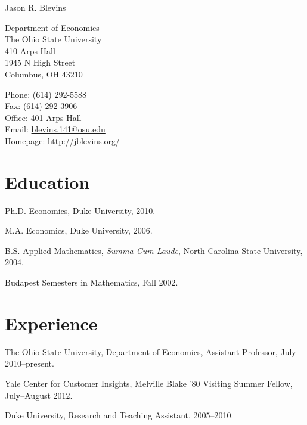 \documentclass[10pt,letterpaper]{article}
\def\name{Jason R. Blevins}
\renewenvironment{itemize}{
  \begin{list}{}{
    \setlength{\leftmargin}{1.5em}
    \setlength{\itemsep}{0.25em}
    \setlength{\parskip}{0pt}
    \setlength{\parsep}{0.25em}
  }
}{
  \end{list}
}
\begin{document}
{\huge \name}


\bigskip

\begin{minipage}[t]{0.495\textwidth}
  Department of Economics \\
  The Ohio State University \\
  410 Arps Hall \\
  1945 N High Street \\
  Columbus, OH 43210
\end{minipage}
\begin{minipage}[t]{0.495\textwidth}
  Phone: (614) 292-5588 \\
  Fax: (614) 292-3906 \\
  Office: 401 Arps Hall \\
  Email: \href{mailto:blevins.141@osu.edu}{blevins.141@osu.edu} \\
  Homepage: \href{http://jblevins.org/}{http://jblevins.org/}
\end{minipage}

\section*{Education}

\begin{itemize}
  \item Ph.D. Economics, Duke University, 2010.
  \item M.A. Economics, Duke University, 2006.
  \item B.S. Applied Mathematics, \textit{Summa Cum Laude},
    North Carolina State University, 2004.
  \item Budapest Semesters in Mathematics, Fall 2002.
\end{itemize}

\section*{Experience}

\begin{itemize}
\item The Ohio State University, Department of Economics,
  Assistant Professor, July 2010--present.
\item Yale Center for Customer Insights,
  Melville Blake '80 Visiting Summer Fellow,
  July--August 2012.
\item Duke University,
  Research and Teaching Assistant,
  2005--2010.
\end{itemize}
\end{document}
